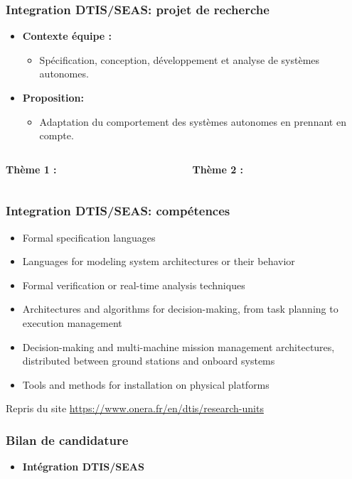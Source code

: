 \documentclass[xcolor=table]{beamer}
\begin{document}
\begin{frame}
	\frametitle{Integration DTIS/SEAS: projet de recherche}
	
	\begin{itemize}
		\item \textbf{Contexte équipe :}
		\begin{itemize}
			\item Spécification, conception, développement et analyse de systèmes autonomes.
		\end{itemize}
		\item \textbf{Proposition:}
		\begin{itemize}
			\item Adaptation du comportement des systèmes autonomes en prennant en compte.
		\end{itemize}
	\end{itemize}
	\begin{columns}
		\begin{column}{.45\textwidth}
			\textbf{Thème 1 :}
		\end{column}
		\begin{column}{.45\textwidth}
			\textbf{Thème 2 :} 
		\end{column}
	\end{columns}
	
\end{frame}

\begin{frame}
	\frametitle{Integration DTIS/SEAS: compétences}
		
	\begin{displayquote}
		\begin{itemize}
			\item \textcolor[rgb]{0.2,0.5,0.2}{Formal specification languages}
			\item \textcolor[rgb]{0.2,0.5,0.2}{Languages for modeling system architectures or their behavior}
			\item \textcolor[rgb]{0.2,0.5,0.2}{Formal verification} or \textcolor[rgb]{0.2,0.5,0.2}{real-time 
			analysis techniques}
			\item Architectures and algorithms for decision-making, from task planning to execution management
			\item Decision-making and multi-machine mission management architectures, distributed between 
			ground stations and onboard systems
			\item \textcolor[rgb]{0.2,0.5,0.2}{Tools and methods for installation on physical platforms}
		\end{itemize}
	\end{displayquote}

	Repris du site \url{https://www.onera.fr/en/dtis/research-units}
	
\end{frame}

\begin{frame}
	\frametitle{Bilan de candidature}
	
	\begin{itemize}
		\item \textbf{Intégration DTIS/SEAS}
	\end{itemize}
\end{frame}
\end{document}
